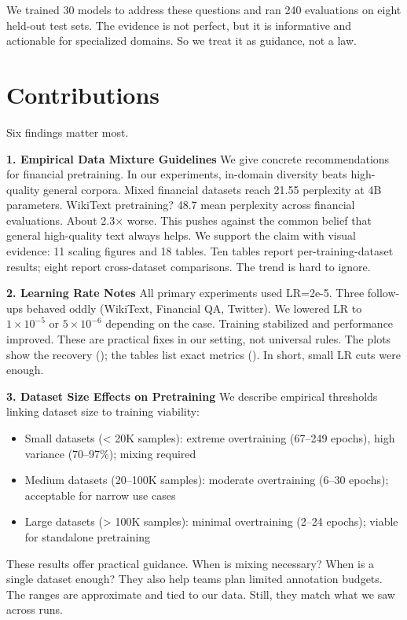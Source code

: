 We trained 30 models to address these questions and ran 240 evaluations on eight held-out test sets. The evidence is not perfect, but it is informative and actionable for specialized domains. So we treat it as guidance, not a law.

\section{Contributions}

Six findings matter most.

\textbf{1. Empirical Data Mixture Guidelines}
We give concrete recommendations for financial pretraining. In our experiments, in-domain diversity beats high-quality general corpora. Mixed financial datasets reach 21.55 perplexity at 4B parameters. WikiText pretraining? 48.7 mean perplexity across financial evaluations. About 2.3$\times$ worse. This pushes against the common belief that general high-quality text always helps. We support the claim with visual evidence: 11 scaling figures and 18 tables. Ten tables report per-training-dataset results; eight report cross-dataset comparisons. The trend is hard to ignore.

\textbf{2. Learning Rate Notes}
All primary experiments used LR=2e-5. Three follow-ups behaved oddly (WikiText, Financial QA, Twitter). We lowered LR to $1\times10^{-5}$ or $5\times10^{-6}$ depending on the case. Training stabilized and performance improved. These are practical fixes in our setting, not universal rules. The plots show the recovery (); the tables list exact metrics (). In short, small LR cuts were enough.

\textbf{3. Dataset Size Effects on Pretraining}
We describe empirical thresholds linking dataset size to training viability:
\begin{itemize}
    \item Small datasets (< 20K samples): extreme overtraining (67--249 epochs), high variance (70--97\%); mixing required
    \item Medium datasets (20--100K samples): moderate overtraining (6--30 epochs); acceptable for narrow use cases
    \item Large datasets (> 100K samples): minimal overtraining (2--24 epochs); viable for standalone pretraining
\end{itemize}
These results offer practical guidance. When is mixing necessary? When is a single dataset enough? They also help teams plan limited annotation budgets. The ranges are approximate and tied to our data. Still, they match what we saw across runs.

